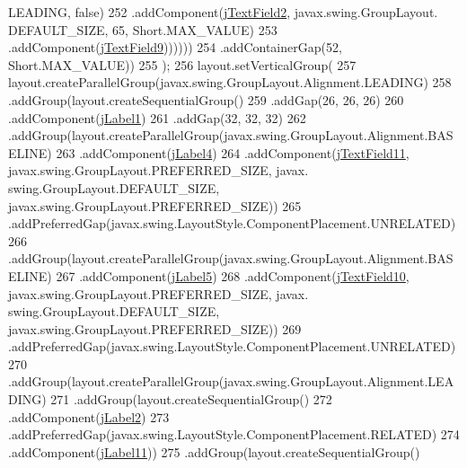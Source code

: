 \begin{DoxyCode}
      LEADING, \textcolor{keyword}{false})
252                                     .addComponent(\mbox{\hyperlink{classsoftware_1_1parasoftware3_a420e41087126364b3392b21a69724347}{jTextField2}}, javax.swing.GroupLayout.
      DEFAULT\_SIZE, 65, Short.MAX\_VALUE)
253                                     .addComponent(\mbox{\hyperlink{classsoftware_1_1parasoftware3_a9fe814b0f2e84f9047438996abdea4a3}{jTextField9}}))))))
254                 .addContainerGap(52, Short.MAX\_VALUE))
255         );
256         layout.setVerticalGroup(
257             layout.createParallelGroup(javax.swing.GroupLayout.Alignment.LEADING)
258             .addGroup(layout.createSequentialGroup()
259                 .addGap(26, 26, 26)
260                 .addComponent(\mbox{\hyperlink{classsoftware_1_1parasoftware3_ae1871baf2f1bc751040bce3b2dc970c1}{jLabel1}})
261                 .addGap(32, 32, 32)
262                 .addGroup(layout.createParallelGroup(javax.swing.GroupLayout.Alignment.BASELINE)
263                     .addComponent(\mbox{\hyperlink{classsoftware_1_1parasoftware3_ae4d1716581a61676309b2c118472da31}{jLabel4}})
264                     .addComponent(\mbox{\hyperlink{classsoftware_1_1parasoftware3_a1936999315b749f7eb88a81dae02582b}{jTextField11}}, javax.swing.GroupLayout.PREFERRED\_SIZE, javax.
      swing.GroupLayout.DEFAULT\_SIZE, javax.swing.GroupLayout.PREFERRED\_SIZE))
265                 .addPreferredGap(javax.swing.LayoutStyle.ComponentPlacement.UNRELATED)
266                 .addGroup(layout.createParallelGroup(javax.swing.GroupLayout.Alignment.BASELINE)
267                     .addComponent(\mbox{\hyperlink{classsoftware_1_1parasoftware3_ab53c1071f13a8fa9a2c371c4b9892253}{jLabel5}})
268                     .addComponent(\mbox{\hyperlink{classsoftware_1_1parasoftware3_a8a6dfd58aa72b1900f0fd0dcf7302181}{jTextField10}}, javax.swing.GroupLayout.PREFERRED\_SIZE, javax.
      swing.GroupLayout.DEFAULT\_SIZE, javax.swing.GroupLayout.PREFERRED\_SIZE))
269                 .addPreferredGap(javax.swing.LayoutStyle.ComponentPlacement.UNRELATED)
270                 .addGroup(layout.createParallelGroup(javax.swing.GroupLayout.Alignment.LEADING)
271                     .addGroup(layout.createSequentialGroup()
272                         .addComponent(\mbox{\hyperlink{classsoftware_1_1parasoftware3_ada0c2e8fce30c1215e2a30042d386f00}{jLabel2}})
273                         .addPreferredGap(javax.swing.LayoutStyle.ComponentPlacement.RELATED)
274                         .addComponent(\mbox{\hyperlink{classsoftware_1_1parasoftware3_ab18f2dadd065ca433f08c878d3ff2b49}{jLabel11}}))
275                     .addGroup(layout.createSequentialGroup()

\end{DoxyCode}
